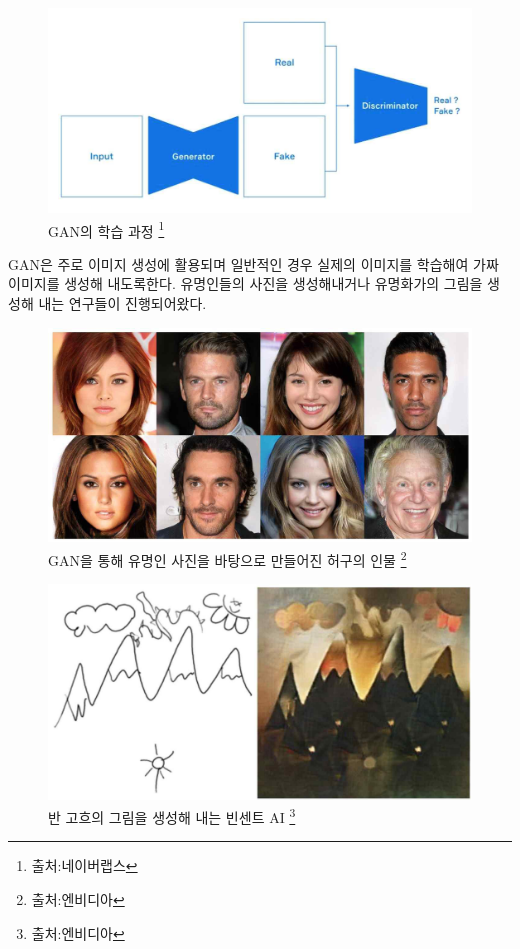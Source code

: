 \documentclass{oblivoir}
\begin{document}
\begin{figure}[h!]
  \centering
    \includegraphics{pic/chp5/img858}
  \caption{GAN의 학습 과정 \protect\footnote{출처:네이버랩스}}
\end{figure}



GAN은 주로 이미지 생성에 활용되며 일반적인 경우 실제의 이미지를 학습해여 가짜 이미지를 생성해 내도록한다. 유명인들의 사진을 생성해내거나 유명화가의 그림을 생성해 내는 연구들이 진행되어왔다.

\begin{figure}[h!]
  \centering
    \includegraphics{pic/chp5/img866}
  \caption{GAN을 통해 유명인 사진을 바탕으로 만들어진 허구의 인물 \protect\footnote{출처:엔비디아}}
\end{figure}


\begin{figure}[h!]
  \centering
    \includegraphics{pic/chp5/img868}
  \caption{반 고흐의 그림을 생성해 내는 빈센트 AI \protect\footnote{출처:엔비디아}}
\end{figure}
\end{document}
